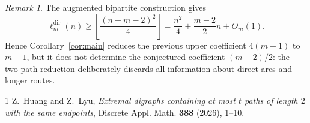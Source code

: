 \documentclass[10pt]{amsart}
\theoremstyle{remark}
\newtheorem{remark}[theorem]{Remark}
\newcommand{\ldir}{\ell^{\mathrm{dir}}}
\begin{document}
\begin{remark}
The augmented bipartite construction gives
\[
 \ldir_m(n)\ge
 \left\lfloor\frac{(n+m-2)^2}{4}\right\rfloor
 =\frac{n^2}{4}+\frac{m-2}{2}n+O_m(1).
\]
Hence Corollary~\ref{cor:main} reduces the previous upper coefficient
$4(m-1)$ to $m-1$, but it does not determine the conjectured coefficient
$(m-2)/2$: the two-path reduction deliberately discards all information
about direct arcs and longer routes.
\end{remark}

\begin{thebibliography}{1}
Z.~Huang and Z.~Lyu,
\emph{Extremal digraphs containing at most $t$ paths of length $2$ with the
same endpoints}, Discrete Appl. Math. \textbf{388} (2026), 1--10.
\end{thebibliography}
\end{document}

